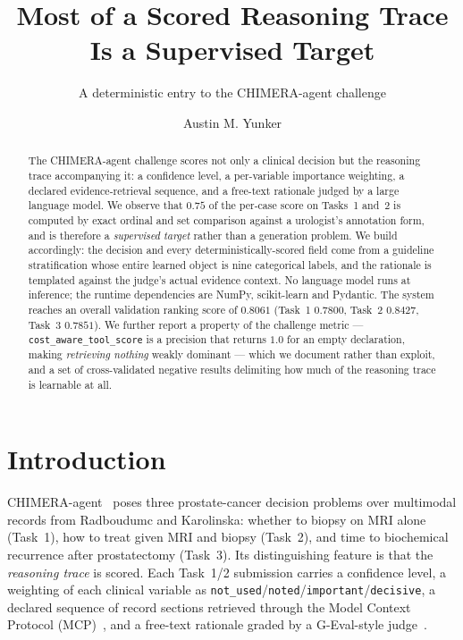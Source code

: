 \documentclass[runningheads]{llncs}
\newcommand{\todo}[1]{\textcolor{red}{[#1]}}
\newcommand{\code}[1]{\texttt{\small #1}}
\begin{document}
\title{Most of a Scored Reasoning Trace Is a Supervised Target}
\subtitle{A deterministic entry to the CHIMERA-agent challenge}

\author{Austin M. Yunker}
\institute{Loyola University Chicago, Chicago IL, USA \\ \email{\todo{e-mail}}}

\maketitle

\begin{abstract}
The CHIMERA-agent challenge scores not only a clinical decision but the reasoning
trace accompanying it: a confidence level, a per-variable importance weighting, a
declared evidence-retrieval sequence, and a free-text rationale judged by a large
language model. We observe that $0.75$ of the per-case score on Tasks~1 and~2 is
computed by exact ordinal and set comparison against a urologist's annotation form,
and is therefore a \emph{supervised target} rather than a generation problem. We
build accordingly: the decision and every deterministically-scored field come from
a guideline stratification whose entire learned object is nine categorical labels,
and the rationale is templated against the judge's actual evidence context. No
language model runs at inference; the runtime dependencies are NumPy,
scikit-learn and Pydantic. The system reaches an overall validation ranking score
of $0.8061$ (Task~1 $0.7800$, Task~2 $0.8427$, Task~3 $0.7851$). We further report
a property of the challenge metric --- \code{cost\_aware\_tool\_score} is a
precision that returns $1.0$ for an empty declaration, making \emph{retrieving
nothing} weakly dominant --- which we document rather than exploit, and a set of
cross-validated negative results delimiting how much of the reasoning trace is
learnable at all.

\end{abstract}

\section{Introduction}

CHIMERA-agent~\cite{chimera} poses three prostate-cancer decision problems over
multimodal records from Radboudumc and Karolinska: whether to biopsy on MRI alone
(Task~1), how to treat given MRI and biopsy (Task~2), and time to biochemical
recurrence after prostatectomy (Task~3). Its distinguishing feature is that the
\emph{reasoning trace} is scored. Each Task~1/2 submission carries a confidence
level, a weighting of each clinical variable as
\code{not\_used}/\code{noted}/\code{important}/\code{decisive}, a declared sequence
of record sections retrieved through the Model Context Protocol
(MCP)~\cite{mcp}, and a free-text rationale graded by a G-Eval-style
judge~\cite{geval}.
\end{document}

